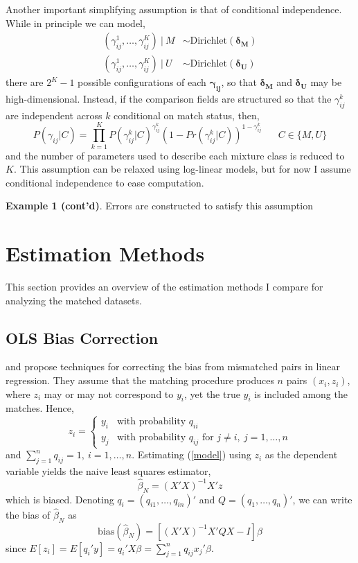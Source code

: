 \documentclass[12pt]{article}
\newcommand\gamij{\mathbf{\gamma_{ij}}}
\begin{document}
Another important simplifying assumption is that of conditional independence.  While in principle we can model, 
\begin{align*} (\gamma_{ij}^1, \dots, \gamma_{ij}^K) \  |\  M &\sim \text{Dirichlet}(\mathbf{\delta_M})\\
 (\gamma_{ij}^1, \dots, \gamma_{ij}^K) \  |\  U &\sim \text{Dirichlet}(\mathbf{\delta_U}) \end{align*}
there are $2^{K}-1$ possible configurations of each $\gamij$, so that $\mathbf{\delta_M}$ and $\mathbf{\delta_U}$ may be high-dimensional.  Instead, if the comparison fields are structured so that the $\gamma_{ij}^{k}$ are independent across $k$ conditional on match status, then,
 \begin{equation} 
 P(\gamma_{ij} | C) = \prod_{k=1}^K P(\gamma_{ij}^{k} | C)^{\gamma_{ij}^{k}}(1-Pr(\gamma_{ij}^{k} | C))^{1-\gamma_{ij}^{k}} \hspace{20pt} C\in \{M, U\} 
 \label{eq:condInd}
 \end{equation}
and the number of parameters used to describe each mixture class is reduced to $K$.  This assumption can be relaxed using log-linear models, but for now I assume conditional independence to ease computation.  

\textbf{Example 1 (cont'd)}.  Errors are constructed to satisfy this assumption

\section{Estimation Methods}
This section provides an overview of the estimation methods I compare for analyzing the matched datasets. 
\subsection{OLS Bias Correction}
 \cite{sw1993} and \cite{lahiri05} propose techniques for correcting the bias from mismatched pairs in linear regression.  They assume that the matching procedure produces $n$ pairs $(x_i, z_i)$, where $z_i$ may or may not correspond to $y_i$, yet the true $y_i$ is included among the matches.   Hence, 
$$z_i = \begin{cases} y_i & \text{with probability $q_{ii}$} \\ y_j & \text{with probability $q_{ij}$ for $j\neq i,\ j = 1,\dots,n $} \end{cases}$$ 
and $\sum_{j=1}^n q_{ij} = 1, \ i=1,\dots, n$.  Estimating (\ref{model}) using $z_i$ as the dependent variable yields the naive least squares estimator, 
\begin{equation} \hat{\beta}_N = (X'X)^{-1} X'z \label{naive} \end{equation}
which is biased.   Denoting $q_i = (q_{i1}, \dots, q_{in})'$ and $Q = (q_1, \dots, q_n)'$, we can write the bias of $\hat{\beta}_N $ as
$$\text{bias}(\hat{\beta}_N) = [(X'X)^{-1} X'QX - I] \beta $$ 
 since $E[z_i] = E[q_i'y]  = q_i'X\beta =  \sum_{j=1}^{n} q_{ij} x_j'\beta $.  
\end{document}
